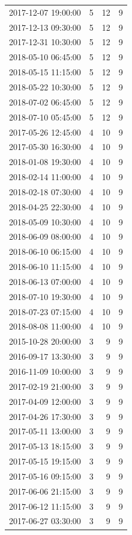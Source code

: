 \begin{tabular}{lrrr}
2017-12-07 19:00:00 & 5 & 12 & 9 \\
2017-12-13 09:30:00 & 5 & 12 & 9 \\
2017-12-31 10:30:00 & 5 & 12 & 9 \\
2018-05-10 06:45:00 & 5 & 12 & 9 \\
2018-05-15 11:15:00 & 5 & 12 & 9 \\
2018-05-22 10:30:00 & 5 & 12 & 9 \\
2018-07-02 06:45:00 & 5 & 12 & 9 \\
2018-07-10 05:45:00 & 5 & 12 & 9 \\
2017-05-26 12:45:00 & 4 & 10 & 9 \\
2017-05-30 16:30:00 & 4 & 10 & 9 \\
2018-01-08 19:30:00 & 4 & 10 & 9 \\
2018-02-14 11:00:00 & 4 & 10 & 9 \\
2018-02-18 07:30:00 & 4 & 10 & 9 \\
2018-04-25 22:30:00 & 4 & 10 & 9 \\
2018-05-09 10:30:00 & 4 & 10 & 9 \\
2018-06-09 08:00:00 & 4 & 10 & 9 \\
2018-06-10 06:15:00 & 4 & 10 & 9 \\
2018-06-10 11:15:00 & 4 & 10 & 9 \\
2018-06-13 07:00:00 & 4 & 10 & 9 \\
2018-07-10 19:30:00 & 4 & 10 & 9 \\
2018-07-23 07:15:00 & 4 & 10 & 9 \\
2018-08-08 11:00:00 & 4 & 10 & 9 \\
2015-10-28 20:00:00 & 3 & 9 & 9 \\
2016-09-17 13:30:00 & 3 & 9 & 9 \\
2016-11-09 10:00:00 & 3 & 9 & 9 \\
2017-02-19 21:00:00 & 3 & 9 & 9 \\
2017-04-09 12:00:00 & 3 & 9 & 9 \\
2017-04-26 17:30:00 & 3 & 9 & 9 \\
2017-05-11 13:00:00 & 3 & 9 & 9 \\
2017-05-13 18:15:00 & 3 & 9 & 9 \\
2017-05-15 19:15:00 & 3 & 9 & 9 \\
2017-05-16 09:15:00 & 3 & 9 & 9 \\
2017-06-06 21:15:00 & 3 & 9 & 9 \\
2017-06-12 11:15:00 & 3 & 9 & 9 \\
2017-06-27 03:30:00 & 3 & 9 & 9 \\

\end{tabular}
